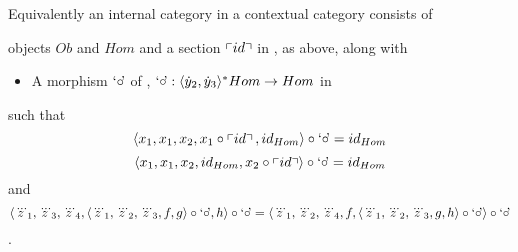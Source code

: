 \begin{lemma}
Equivalently an internal category in a contextual category \catcw consists of
\item objects $Ob$ and  $Hom$  and a section $\left\ulcorner id\right\urcorner$ in \catc,  as above, along with
\begin{itemize}
\item A morphism $\text{`$\circ$\kern-2pt'}$ of \catc, $\text{`$\circ$\kern-2pt'}: \langle\dot y_2,\dot y_3\rangle^*Hom \rightarrow Hom$ in \catc
\end{itemize}
such that
\begin{equation}
\label{leftidentityrepresentation2}
\tuple{x_1,x_1,x_2,x_1\circ \fid,id_{Hom}} \circ \compmorph =id_{Hom}
\end{equation}
\begin{equation}
\label{rightidentityrepresentation2}
\tuple{x_1,x_1,x_2,id_{Hom},x_2 \circ \fid} \circ \compmorph =id_{Hom}
\end{equation}
and
\begin{equation}
\label{associativityrepresentation2}
\assocequivalentlhs = \assocequivalentrhs
\end{equation}.
\end{lemma}
